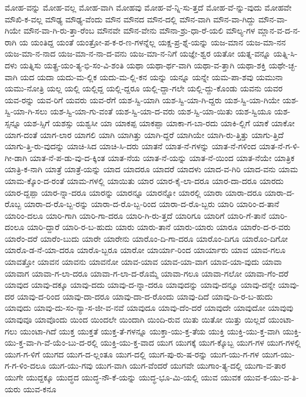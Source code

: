 {ಮೋಹ-ವನ್ನು
ಮೋಹ-ವಲ್ಲ
ಮೋಹ-ವಾಗಿ
ಮೋಹವು
ಮೋಹ-ವೆ-ನ್ನಿ-ಸು-ತ್ತದೆ
ಮೋಹ-ವೆ-ನ್ನು-ವುದು
ಮೋಹವೇ
ಮೌಖಿ-ಕ-ವಲ್ಲ
ಮೌಢ್ಯ
ಮೌಢ್ಯ-ವೆಂದು
ಮೌನ
ಮೌನದ
ಮೌನ-ದಲ್ಲಿ
ಮೌನ-ವಾಗಿ
ಮೌನ-ವಾ-ಗಿದ್ದು
ಮೌನ-ವಾ-ಗಿಯೇ
ಮೌನ-ವಾ-ಗಿ-ರು-ತ್ತಾ-ರೆಂಬ
ಮೌನವೇ
ಮೌನ-ವೇನು
ಮೌನಾ-ಶ್ರು-ಧಾ-ರೆ-ಯಲಿ
ಮೌಲ್ಯ-ಗಳ
ಮ್ಲಾನ-ವ-ದ-ನ-ರಾಗಿ
ಯ
ಯಂತಿದ್ದ
ಯಂತೆ
ಯಂತ್ರೋ-ಪ-ಕ-ರ-ಣ-ಗಳನ್ನೆಲ್ಲ
ಯಕ್ಷ-ಪ್ರ-ಶ್ನೆ-ಯನ್ನು
ಯಜ-ಮಾನ
ಯಜ-ಮಾ-ನನ
ಯಜ-ಮಾ-ನ-ನಾದ
ಯಜ-ಮಾ-ನ-ನಾ-ದ-ವನು
ಯಜ-ಮಾ-ನ-ನಿಗೆ
ಯಜ್ಞೇ-ಶ್ವರ
ಯತೋ
ಯತ್ನ-ವನ್ನೂ
ಯತ್ನಿ-ಸಿ-ದಳು
ಯತ್ನಿಸು
ಯತ್ಪ್ರ-ಯಂ-ತ್ಯ-ಭಿ-ಸಂ-ವಿ-ಶಂತಿ
ಯಥಾ
ಯಥಾ-ರ್ಥ-ವಾಗಿ
ಯಥಾ-ವ-ತ್ತಾಗಿ
ಯಥಾ-ಶಕ್ತಿ
ಯಥೇ-ಚ್ಛ-ವಾಗಿ
ಯದ
ಯದಾ
ಯದು-ಮ-ಲ್ಲಿಕ
ಯದು-ಮ-ಲ್ಲಿ-ಕನ
ಯನ್ನು
ಯನ್ನೂ
ಯನ್ನೇ
ಯಮ-ಪಾ-ಶವು
ಯಮುನಾ
ಯಮು-ನೋತ್ರಿ
ಯಲ್ಲ
ಯಲ್ಲಿ
ಯಲ್ಲಿದ್ದ
ಯಲ್ಲಿ-ದ್ದರೂ
ಯಲ್ಲಿ-ದ್ದಾ-ಗಲೇ
ಯಲ್ಲಿ-ದ್ದು-ಕೊಂಡು
ಯವನು
ಯವರ
ಯವ-ರನ್ನು
ಯವ-ರಿಗೆ
ಯವರು
ಯವ-ರೆಗೆ
ಯಶ-ಸ್ವಿ-ಯಾಗಿ
ಯಶ-ಸ್ವಿ-ಯಾ-ಗಿ-ದ್ದರು
ಯಶ-ಸ್ವಿ-ಯಾ-ಗಿಯೇ
ಯಶ-ಸ್ವಿ-ಯಾ-ಗಿ-ಸಲು
ಯಶ-ಸ್ವಿ-ಯಾ-ಗು-ವಂತೆ
ಯಶ-ಸ್ವಿ-ಯಾ-ದ-ವರು
ಯಶ-ಸ್ವಿ-ಯಾ-ಯಿತು
ಯಶ-ಸ್ವಿಯೂ
ಯಶ-ಸ್ಸನ್ನೂ
ಯಶ-ಸ್ಸಿಗೆ
ಯಶಸ್ಸು
ಯಶ್ವಸೀ
ಯಾ
ಯಾಕಪ್ಪ
ಯಾಕಪ್ಪಾ
ಯಾಕಾ-ಗ-ಬಾ-ರದು
ಯಾಕಿ-ಲ್ಲಿಗೆ
ಯಾಕೆ
ಯಾಕೋ
ಯಾಗ-ದಂತೆ
ಯಾಗ-ಲಾರ
ಯಾಗಲಿ
ಯಾಗಿ
ಯಾಗಿತ್ತು
ಯಾಗಿ-ದ್ದರೆ
ಯಾಗಿಯೇ
ಯಾಗಿ-ರು-ತ್ತಿತ್ತು
ಯಾಗು-ತ್ತಿದೆ
ಯಾಗು-ತ್ತಿ-ರು-ವುದನ್ನು
ಯಾಚಿ-ಸಿದ
ಯಾಚಿ-ಸಿ-ದರು
ಯಾತನೆ
ಯಾತ-ನೆ-ಗಳನ್ನು
ಯಾತ-ನೆ-ಗಳಿಂದ
ಯಾತ-ನೆ-ಗ-ಳಿ-ಗೀ-ಡಾಗಿ
ಯಾತ-ನೆ-ಪ-ಡು-ವು-ದ-ಕ್ಕಿಂತ
ಯಾತ-ನೆಯ
ಯಾತ-ನೆ-ಯನ್ನು
ಯಾತ-ನೆ-ಯಿಂದ
ಯಾತ-ನೆಯೇ
ಯಾತ್ರಿಕ
ಯಾತ್ರಿ-ಕ-ನಾಗಿ
ಯಾತ್ರೆ
ಯಾತ್ರೆ-ಯನ್ನು
ಯಾದ
ಯಾದರೂ
ಯಾದರೆ
ಯಾದಳು
ಯಾದ-ವ-ಗಿರಿ
ಯಾದ-ವನು
ಯಾಮ
ಯಾಮ-ಕ್ಕೊಂ-ದ-ರಂತೆ
ಯಾಮ-ಗಳಲ್ಲಿ
ಯಾಯಿತು
ಯಾರ
ಯಾರ-ಕೈ-ಲಾ-ದರೂ
ಯಾರ-ದಾ-ದರೂ
ಯಾರದು
ಯಾರ-ದ್ದಪ್ಪಾ
ಯಾರ-ನ್ನಾ-ದರೂ
ಯಾರನ್ನು
ಯಾರನ್ನೂ
ಯಾರನ್ನೋ
ಯಾರಲ್ಲಿ
ಯಾರಾ
ಯಾರಾ-ದರೂ
ಯಾರಾ-ದ-ರೊಬ್ಬ
ಯಾರಾ-ದ-ರೊ-ಬ್ಬ-ರನ್ನು
ಯಾರಾ-ದ-ರೊ-ಬ್ಬ-ರಿಂದ
ಯಾರಾ-ದ-ರೊ-ಬ್ಬರು
ಯಾರಿ
ಯಾರಿಂ-ದ-ತಾನೆ
ಯಾರಿಂ-ದಲೂ
ಯಾರಿ-ಗಾಗಿ
ಯಾರಿ-ಗಾ-ದರೂ
ಯಾರಿ-ಗಿ-ರು-ತ್ತದೆ
ಯಾರಿಗೂ
ಯಾರಿಗೆ
ಯಾರಿ-ಗೆ-ತಾನೆ
ಯಾರಿ-ದಂಲೂ
ಯಾರಿ-ದ್ದಾರೆ
ಯಾರಿ-ರ-ಬ-ಹುದು
ಯಾರು
ಯಾರು-ತಾನೆ
ಯಾರು-ಯಾರು
ಯಾರೂ
ಯಾರೆಂ-ದ-ರ-ವರು
ಯಾರೆಂ-ದರೆ
ಯಾರೆಂ-ಬುದು
ಯಾರೇ
ಯಾರೇನು
ಯಾರೊಂ-ದಿ-ಗಾ-ದರೂ
ಯಾರೊಂ-ದಿಗೂ
ಯಾರೊಂ-ದಿಗೋ
ಯಾರೊ-ಡ-ನೆ-ಯಾ-ದರೂ
ಯಾರೊ-ಬ್ಬರೂ
ಯಾರೋ
ಯಾರ್ಯಾ-ರಿಂದ
ಯಾರ್ಯಾರು
ಯಾವ
ಯಾವ-ಗಲೂ
ಯಾವತ್ತೋ
ಯಾವನ
ಯಾವನು
ಯಾವನೋ
ಯಾವ-ಯಾವ
ಯಾವ-ಯಾ-ವಾಗ
ಯಾವ-ಯಾ-ವುದು
ಯಾವಾ
ಯಾವಾಗ
ಯಾವಾ-ಗ-ಲಾ-ದರೂ
ಯಾವಾ-ಗ-ಲಾ-ದ-ರೊಮ್ಮೆ
ಯಾವಾ-ಗಲೂ
ಯಾವಾ-ಗಲೋ
ಯಾವಾ-ಗೆಂ-ದರೆ
ಯಾವುದ
ಯಾವು-ದಕ್ಕೂ
ಯಾವು-ದದು
ಯಾವು-ದ-ನ್ನಾ-ದರೂ
ಯಾವುದನ್ನು
ಯಾವು-ದನ್ನೂ
ಯಾವು-ದನ್ನೇ
ಯಾವು-ದರ
ಯಾವು-ದ-ರಿಂದ
ಯಾವು-ದಾ-ದರೂ
ಯಾವು-ದಾ-ದ-ರೊಂದು
ಯಾವು-ದಿದೆ
ಯಾವು-ದಿ-ರ-ಬ-ಹುದು
ಯಾವುದು
ಯಾವು-ದು-ಸಂ-ನ್ಯಾ-ಸ-ಜೀ-ವ-ನವೆ
ಯಾವುದೂ
ಯಾವು-ದೆಂ-ದರೆ
ಯಾವುದೇ
ಯಾವುದೋ
ಯಾವುವು
ಯಾವುವೂ
ಯಾವೊಂದು
ಯಿಂದ
ಯಿಂದಲೇ
ಯಿಂದಾಗಿ
ಯಿಂದಿ-ರುವ
ಯಿತು
ಯಿತೋ
ಯಿತ್ತು
ಯಿಲ್ಲದೆ
ಯುಂಟಾ-ಗಲು
ಯುಂಟಾ-ಗಿದೆ
ಯುಕ್ತ
ಯುಕ್ತತೆ
ಯುಕ್ತ-ತೆ-ಗಳನ್ನೂ
ಯುಕ್ತಾ-ಯು-ಕ್ತ-ತೆಯ
ಯುಕ್ತಿ
ಯುಕ್ತಿ-ಯು-ಕ್ತ-ವಾಗಿ
ಯುಕ್ತಿ-ಯು-ಕ್ತ-ವಾ-ಗಿ-ವೆ-ಯೆಂ-ಬು-ದ-ರಲ್ಲಿ
ಯುಕ್ತಿ-ಯು-ಕ್ತ-ವಾದ
ಯುಗ
ಯುಗಕ್ಕೆ
ಯುಗ-ಕ್ಕೊಬ್ಬ
ಯುಗ-ಗಳ
ಯುಗ-ಗಳಲ್ಲಿ
ಯುಗ-ಗ-ಳಿಗೆ
ಯುಗದ
ಯುಗ-ದ-ಲ್ಲಂತೂ
ಯುಗ-ದಲ್ಲಿ
ಯುಗ-ಪು-ರು-ಷ-ರನ್ನು
ಯುಗ-ಯು-ಗ-ಗಳ
ಯುಗ-ಯು-ಗ-ಗ-ಳಿಂ-ದಲೂ
ಯುಗ-ಯು-ಗವು
ಯುಗ-ವಾಗಿ
ಯುಗ-ವೆಂದರೆ
ಯುಗವೇ
ಯುಗಾಂ-ತ್ಯ-ದಲ್ಲಿ
ಯುಗಾ-ವ-ತಾರ
ಯುಗೇ
ಯುದ್ದಕ್ಕೂ
ಯುದ್ಧದ
ಯುದ್ಧ-ನೌ-ಕೆ-ಯನ್ನು
ಯುದ್ಧ-ಭೂ-ಮಿ-ಯಲ್ಲಿ
ಯುವ
ಯುವಕ
ಯುವ-ಕ-ಯು-ವ-ತಿ-ಯರು
ಯುವ-ಕನೂ
}
